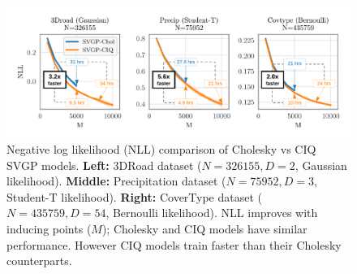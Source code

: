 
\begin{figure}[t!]
  \centering
  \includegraphics[width=\linewidth]{figures/variational_nll.pdf}
  \caption[Negative log likelihood (NLL) comparison of Cholesky-whitened vs CIQ-whitened SVGP models.]{
    Negative log likelihood (NLL) comparison of Cholesky vs CIQ SVGP models.
    {\bf Left:} 3DRoad dataset ($N=326155, D=2$, Gaussian likelihood).
    {\bf Middle:} Precipitation dataset ($N=75952, D=3$, Student-T likelihood).
    {\bf Right:} CoverType dataset ($N=435759, D=54$, Bernoulli likelihood).
    NLL improves with inducing points ($M$); Cholesky and CIQ models have similar performance.
    However CIQ models train faster than their Cholesky counterparts.
  }
  \label{fig:variational_nll}
\end{figure}


